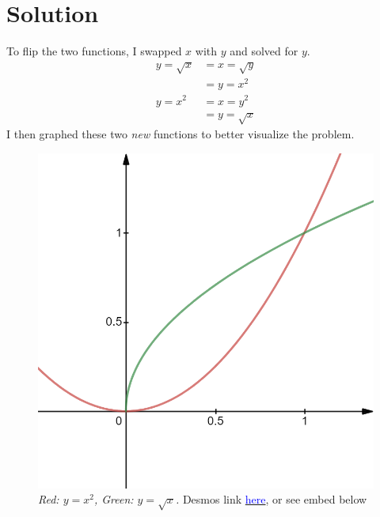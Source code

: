 \documentclass[letterpaper, 12pt]{article}
\begin{document}
\section{Solution}
To flip the two functions, I swapped $x$ with $y$ and solved for $y$.
\begin{align}
    y=\sqrt{x} & =x=\sqrt{y}         \\
               & =\boxed{y=x^{2}}    \\
    y=x^{2}    & =x=y^{2}            \\
               & =\boxed{y=\sqrt{x}}
\end{align}
I then graphed these two \textit{new} functions to better visualize the problem.
\begin{figure}[H]
    \begin{center}
        \includegraphics[scale=.3]{twoFunc.png}
        \caption{\textit{Red: $y=x^2$, Green: $y=\sqrt{x}$.} Desmos link \href{https://www.desmos.com/calculator/jbowfwj9rn}{\textcolor{blue}{here}}, or see embed below}
    \end{center}
\end{figure}
\end{document}
